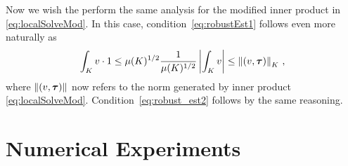 \documentclass[Proposal.tex]{subfiles}
\begin{document}
Now we wish the perform the same analysis for the modified inner product in
\eqref{eq:localSolveMod}. In this case,
condition~\eqref{eq:robustEst1} follows even more naturally as
\begin{equation}
   \int_K v\cdot1\leq\mu(K)^{1/2}\frac{1}{\mu(K)^{1/2}}\left| \int_Kv \right|
   \leq\left\| (v,\boldsymbol\tau) \right\|_K\,,
   \label{eq:robustProof2}
\end{equation}
where $\left\| (v,\boldsymbol\tau) \right\|$ now refers to the norm generated by inner product
\eqref{eq:localSolveMod}. Condition~\eqref{eq:robust_est2} follows by the same
reasoning.

%                                                                                                                                                          
%                                                                                                                                                          
%                                                                                                                                                          


\section{Numerical Experiments}
\end{document}
